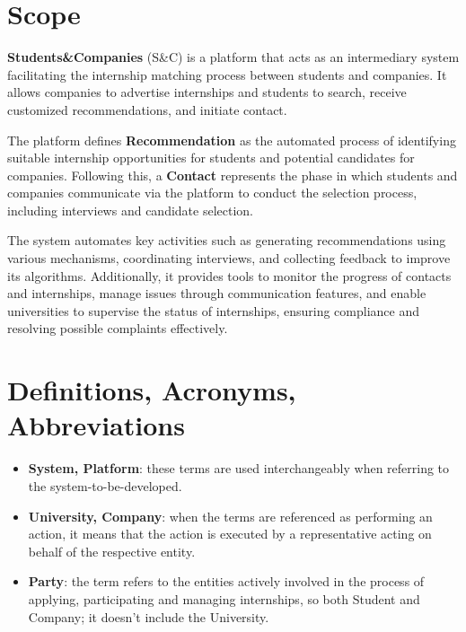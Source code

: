 \section{Scope}
\label{sec:scope}%
\textbf{Students\&Companies} (S\&C) is a platform that acts as an intermediary system facilitating the internship matching process between students and companies. It allows companies to advertise internships and students to search, receive customized recommendations, and initiate contact.

The platform defines \textbf{Recommendation} as the automated process of identifying suitable internship opportunities for students and potential candidates for companies. Following this, a \textbf{Contact} represents the phase in which students and companies communicate via the platform to conduct the selection process, including interviews and candidate selection.

The system automates key activities such as generating recommendations using various mechanisms, coordinating interviews, and collecting feedback to improve its algorithms. Additionally, it provides tools to monitor the progress of contacts and internships, manage issues through communication features, and enable universities to supervise the status of internships, ensuring compliance and resolving possible complaints effectively.

\section{Definitions, Acronyms, Abbreviations}
\label{sec:definition_acronyms_abbreviations}

\begin{itemize}

\item \textbf{System, Platform}: these terms are used interchangeably when referring to the system-to-be-developed.

\item \textbf{University, Company}: when the terms are referenced as performing an action, it means that the action is executed by a representative acting on behalf of the respective entity.

\item \textbf{Party}: the term refers to the entities actively involved in the process of applying, participating and managing internships, so both Student and Company; it doesn't include the University.

\end{itemize}

